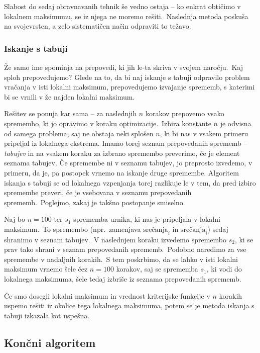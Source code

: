 \documentclass[a4paper]{article}
\begin{document}
Slabost do sedaj obravnavanih tehnik še vedno ostaja -- ko enkrat obtičimo v lokalnem
maksimumu, se iz njega ne moremo rešiti.\ Naslednja metoda poskuša na svojevrsten, a zelo
sistematičen način odpraviti to težavo.

\subsubsection{Iskanje s tabuji} %

Že samo ime spominja na prepovedi, ki jih le-ta skriva v svojem naročju.\ Kaj sploh prepovedujemo?
Glede na to, da bi naj iskanje s tabuji odpravilo problem vračanja v isti lokalni maksimum,
prepovedujemo izvajanje sprememb, s katerimi bi se vrnili v že najden lokalni maksimum.

Rešitev se ponuja kar sama -- za naslednjih $n$ korakov prepovemo vsako spremembo, ki jo
opravimo v koraku optimizacije.\ Izbira konstante $n$ je odvisna od samega problema, saj
ne obstaja neki splošen $n$, ki bi nas v vsakem primeru pripeljal iz lokalnega ekstrema.
Imamo torej seznam prepovedanih sprememb -- \emph{tabujev} in na vsakem koraku za izbrano
spremembo preverimo, če je element seznama tabujev. Če spremembe ni v seznamu tabujev, jo
preprosto izvedemo, v primeru, da je, pa postopek vrnemo na iskanje druge spremembe.
Algoritem iskanja s tabuji se od lokalnega vzpenjanja torej razlikuje le v tem, da pred
izbiro spremembe preveri, če je vsebovana v seznamu prepovedanih sprememb.\ Poglejmo, zakaj
je takšno postopanje smiselno.

Naj bo $n=100$ ter $s_1$ sprememba urnika, ki nas je pripeljala v lokalni maksimum.\ To
spremembo (npr.\ zamenjava $\mathrm{srečanja}_i$ in $\mathrm{srečanja}_i$) sedaj shranimo v
seznam tabujev.\ V naslednjem koraku izvedemo spremembo $s_2$, ki se prav tako shrani v
seznam prepovedanih sprememb.\ Podobno naredimo za vse spremembe v nadaljnih korakih.\ S
tem poskrbimo, da se lahko v isti lokalni maksimum vrnemo šele čez $n=100$ korakov, saj
se sprememba $s_1$, ki vodi do lokalnega maksimuma, šele tedaj izbriše iz seznama
prepovedanih sprememb.

Če smo dosegli lokalni maksimum in vrednost kriterijske funkcije v $n$ korakih uspemo
rešiti iz okolice tega lokalnega maksimuma, potem se je metoda iskanja s tabuji izkazala
kot uspešna.

\subsection{Končni algoritem} %
\end{document}
